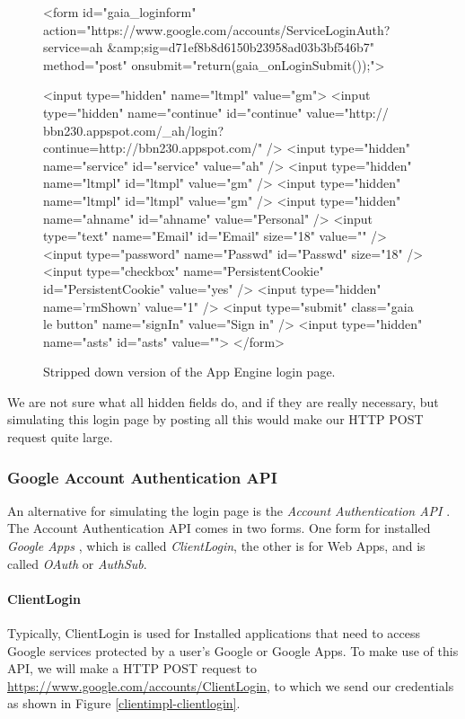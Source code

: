 \begin{figure*}[ht] %
\begin{center}
\begin{code}
<form id="gaia_loginform" 
action="https://www.google.com/accounts/ServiceLoginAuth?service=ah
    &amp;sig=d71ef8b8d6150b23958ad03b3bf546b7" 
  method="post"
  onsubmit="return(gaia_onLoginSubmit());">

<input type="hidden" name="ltmpl" value="gm">
<input type="hidden" name="continue" id="continue"
  value="http:// bbn230.appspot.com/_ah/login?
  continue=http://bbn230.appspot.com/" />
<input type="hidden" name="service" id="service" value="ah" />
<input type="hidden" name="ltmpl" id="ltmpl" value="gm" />
<input type="hidden" name="ltmpl" id="ltmpl" value="gm" />
<input type="hidden" name="ahname" id="ahname" value="Personal" />
<input type="text" name="Email"  id="Email" size="18" value="" />
<input type="password" name="Passwd" id="Passwd" size="18" />
<input type="checkbox" name="PersistentCookie" id="PersistentCookie" 
  value="yes" />
<input type="hidden" name='rmShown' value="1" />
<input type="submit" class="gaia le button" name="signIn" value="Sign in" />
<input type="hidden" name="asts" id="asts" value="">
</form>
\end{code}
\caption{Stripped down version of the App Engine
login page.\label{clientimpl-loginform}}
\end{center}
\end{figure*}

We are not sure what all hidden fields do, and if they are really necessary, but
simulating this login page by posting all this would make our HTTP POST request
quite large.

\subsubsection{Google Account Authentication API}
An alternative for simulating the login page is the \emph{Account
Authentication API} \cite{account-auth-api}. The Account Authentication API
comes in two forms. One form for installed \emph{Google Apps}
\cite{google-apps-www}, which is called \emph{ClientLogin}, the other is for Web
Apps, and is called \emph{OAuth} or \emph{AuthSub}.

\paragraph{ClientLogin}
Typically, ClientLogin is used for Installed applications that need to access
Google services protected by a user's Google or Google Apps. To make use of this
API, we will make a HTTP POST request to
\url{https://www.google.com/accounts/ClientLogin}, to which we send our
credentials as shown in Figure \ref{clientimpl-clientlogin}.

